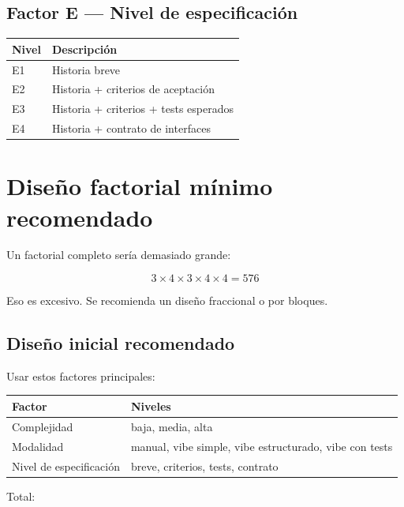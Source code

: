 \documentclass[11pt,a4paper]{article}
\begin{document}
\subsection{Factor E --- Nivel de especificaci\'on}

\begin{table}[h!]
\centering
\begin{tabular}{ll}
\toprule
\textbf{Nivel} & \textbf{Descripci\'on} \\
\midrule
E1 & Historia breve \\
E2 & Historia + criterios de aceptaci\'on \\
E3 & Historia + criterios + tests esperados \\
E4 & Historia + contrato de interfaces \\
\bottomrule
\end{tabular}
\end{table}

\section{Dise\~no factorial m\'inimo recomendado}

Un factorial completo ser\'ia demasiado grande:

\begin{equation}
3 \times 4 \times 3 \times 4 \times 4 = 576
\end{equation}

Eso es excesivo. Se recomienda un dise\~no fraccional o por bloques.

\subsection{Dise\~no inicial recomendado}

Usar estos factores principales:

\begin{table}[h!]
\centering
\begin{tabular}{ll}
\toprule
\textbf{Factor} & \textbf{Niveles} \\
\midrule
Complejidad & baja, media, alta \\
Modalidad & manual, vibe simple, vibe estructurado, vibe con tests \\
Nivel de especificaci\'on & breve, criterios, tests, contrato \\
\bottomrule
\end{tabular}
\end{table}

Total:
\end{document}
